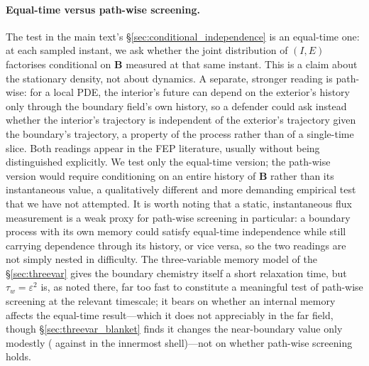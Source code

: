 \documentclass[11pt]{article}
\newcommand{\eps}{\varepsilon}
\newcommand{\bB}{\boldsymbol{B}}
\begin{document}
\paragraph{Equal-time versus path-wise screening.} The test in the main text's \S\ref{sec:conditional_independence} is an equal-time one: at each sampled instant, we ask whether the joint distribution of $(I,E)$ factorises conditional on $\bB{}$ measured at that same instant. This is a claim about the stationary density, not about dynamics. A separate, stronger reading is path-wise: for a local PDE, the interior's future can depend on the exterior's history only through the boundary field's own history, so a defender could ask instead whether the interior's trajectory is independent of the exterior's trajectory given the boundary's trajectory, a property of the process rather than of a single-time slice. Both readings appear in the FEP literature, usually without being distinguished explicitly. We test only the equal-time version; the path-wise version would require conditioning on an entire history of $\bB{}$ rather than its instantaneous value, a qualitatively different and more demanding empirical test that we have not attempted. It is worth noting that a static, instantaneous flux measurement is a weak proxy for path-wise screening in particular: a boundary process with its own memory could satisfy equal-time independence while still carrying dependence through its history, or vice versa, so the two readings are not simply nested in difficulty. The three-variable memory model of the \S\ref{sec:threevar} gives the boundary chemistry itself a short relaxation time, but $\tau_w=\eps^2$ is, as noted there, far too fast to constitute a meaningful test of path-wise screening at the relevant timescale; it bears on whether an internal memory affects the equal-time result---which it does not appreciably in the far field, though \S\ref{sec:threevar_blanket} finds it changes the near-boundary value only modestly ( against  in the innermost shell)---not on whether path-wise screening holds.
\end{document}
